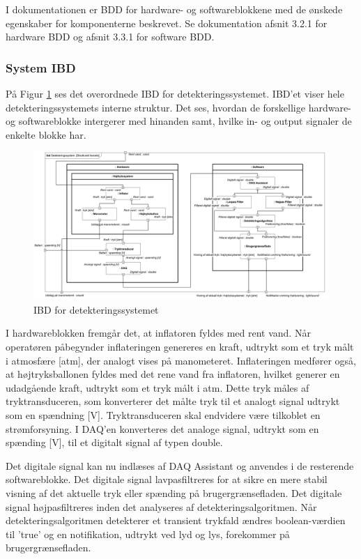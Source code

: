 I dokumentationen er BDD for hardware- og softwareblokkene med de ønskede egenskaber for komponenterne beskrevet. Se dokumentation afsnit 3.2.1 for hardware BDD og afsnit 3.3.1 for software BDD. 

\subsubsection{System IBD}
På Figur \ref{SystemIBD} ses det overordnede IBD for detekteringssystemet. IBD'et viser hele detekteringssystemets interne struktur. Det ses, hvordan de forskellige hardware- og softwareblokke intergerer med hinanden samt, hvilke in- og output signaler de enkelte blokke har. 

\begin{figure}[H]
	\centering
	\includegraphics[width=1\textwidth]{Figure/SystemIBD}
	\caption{IBD for detekteringssystemet}
	\label{SystemIBD}
\end{figure}

I hardwareblokken fremgår det, at inflatoren fyldes med rent vand. Når operatøren påbegynder inflateringen genereres en kraft, udtrykt som et tryk målt i atmosfære [atm], der analogt vises på manometeret. Inflateringen medfører også, at højtryksballonen fyldes med det rene vand fra inflatoren, hvilket generer en udadgående kraft, udtrykt som et tryk målt i atm. Dette tryk måles af tryktransduceren, som konverterer det målte tryk til et analogt signal udtrykt som en spændning [V]. Tryktransduceren skal endvidere være tilkoblet en strømforsyning. I DAQ'en konverteres det analoge signal, udtrykt som en spænding [V], til et digitalt signal af typen double.

Det digitale signal kan nu indlæses af DAQ Assistant og anvendes i de resterende softwareblokke. Det digitale signal lavpasfiltreres for at sikre en mere stabil visning af det aktuelle tryk eller spænding på brugergrænsefladen. Det digitale signal højpasfiltreres inden det analyseres af detekteringsalgoritmen. Når detekteringsalgoritmen detekterer et transient trykfald ændres boolean-værdien til 'true' og en notifikation, udtrykt ved lyd og lys, forekommer på brugergrænsefladen.   

